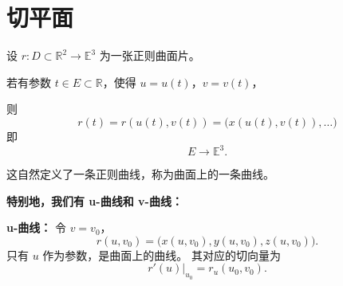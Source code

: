 \documentclass[lang=cn,10pt,thmcnt=section]{elegantbook}
\begin{document}
\section{切平面}
\begin{definition}[曲面上的曲线]
    设 $r: D \subset \mathbb{R}^2 \rightarrow \mathbb{E}^3$ 为一张正则曲面片。
    
    若有参数 $t \in E \subset \mathbb{R}$，使得 $u = u(t)$，$v = v(t)$，
    
    则
    $$
    r(t) = r(u(t), v(t)) = \big(x(u(t), v(t)), \ldots\big)
    $$
    即
    $$
    E \longrightarrow \mathbb{E}^3.
    $$
    
    这自然定义了一条正则曲线，称为曲面上的一条曲线。
    \end{definition}     
    \textbf{特别地，我们有 u-曲线和 v-曲线：}

    \textbf{u-曲线：} 令 $v = v_0$，
    $$
    r(u, v_0) = \big(x(u, v_0), y(u, v_0), z(u, v_0)\big).
    $$
    只有 $u$ 作为参数，是曲面上的曲线。
    其对应的切向量为
    $$
    \left. r'(u) \right|_{u_0} = r_u(u_0, v_0).
    $$
    
\end{document}
